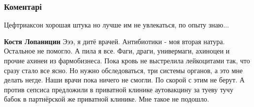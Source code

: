  
 
 
 
 
\subsubsection{Коментарі}

\begin{itemize}
 



 
Цефтриаксон хорошая штука но лучше им не увлекаться, по опыту знаю... \Smiley[1.0][yellow]

\begin{itemize}
 
\textbf{Костя Лопаницин} Эээ, я дитё врачей. Антибиотики - моя вторая натура. Остальное не помогло. А пила я все. Фаги, драги, универмаги, ахиноцеи и прочие ахинеи из фармобизнеса. Пока кровь не выстрелила лейкоцитами так, что сразу стало все ясно. Но нужно обследоваться, три системы органов, а это мне делать негде. Наши врачи пока ничего не смогли. По скорой с этим не берут. А против сепсиса предложили в приватной клинике аутовакцину за туеву тучу бабок в партнёрской же приватной клинике. Мне такое не подошло.

 

\end{itemize}
\end{itemize}
